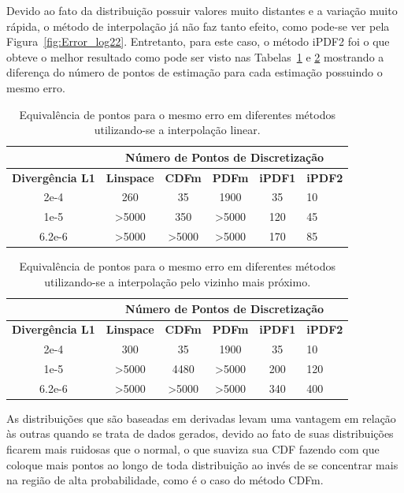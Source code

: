 Devido ao fato da distribuição possuir valores muito distantes e a variação muito rápida, o método de interpolação já não faz tanto efeito, como pode-se ver pela Figura~\ref{fig:Error_log22}. Entretanto, para este caso, o método \ac{iPDF2} foi o que obteve o melhor resultado como pode ser visto nas Tabelas~\ref{tab:error_eq} e \ref{tab:error_eq_near} mostrando a diferença do número de pontos de estimação para cada estimação possuindo o mesmo erro.

\begin{table}[H]
	\centering
	\caption{Equivalência de pontos para o mesmo erro em diferentes métodos utilizando-se a interpolação linear.}
	\label{tab:error_eq}
\begin{tabular}{c|ccccl}
	& \multicolumn{5}{c}{\textbf{Número de Pontos de Discretização}}    \\ \hline
	\textbf{Divergência L1}  & \textbf{Linspace} & \textbf{CDFm} & \textbf{PDFm}  & \textbf{iPDF1} & \textbf{iPDF2} \\ \hline
	2e-4  & 260      & 35   & 1900   & 35    & 10    \\ \hline
	1e-5 & >5000    & 350  & >5000 & 120   & 45    \\ \hline
	6.2e-6 & >5000    & >5000 & >5000 & 170   & 85  
\end{tabular}
\end{table}

\begin{table}[H]
	\centering
	\caption{Equivalência de pontos para o mesmo erro em diferentes métodos utilizando-se a interpolação pelo vizinho mais próximo.}
	\label{tab:error_eq_near}
	\begin{tabular}{c|ccccl}
		& \multicolumn{5}{c}{\textbf{Número de Pontos de Discretização}}    \\ \hline
		\textbf{Divergência L1}  & \textbf{Linspace} & \textbf{CDFm} & \textbf{PDFm}  & \textbf{iPDF1} & \textbf{iPDF2} \\ \hline
		2e-4  & 300      & 35   & 1900   & 35    & 10    \\ \hline
		1e-5 & >5000    & 4480  & >5000 & 200   & 120    \\ \hline
		6.2e-6 & >5000    & >5000 & >5000 & 340   & 400  
	\end{tabular}
\end{table}




As distribuições que são baseadas em derivadas levam uma vantagem em relação às outras quando se trata de dados gerados, devido ao fato de suas distribuições ficarem mais ruidosas que o normal, o que suaviza sua CDF fazendo com que coloque mais pontos ao longo de toda distribuição ao invés de se concentrar mais na região de alta probabilidade, como é o caso do método \ac{CDFm}.

